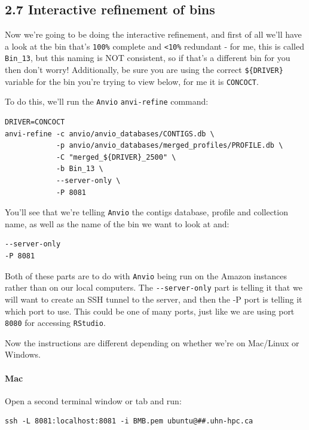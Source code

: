 \documentclass[
]{book}
\begin{document}
\subsection{2.7 Interactive refinement of bins}\label{interactive-refinement-of-bins}

Now we're going to be doing the interactive refinement, and first of all we'll have a look at the bin that's \texttt{100\%} complete and \texttt{\textless{}10\%} redundant - for me, this is called \texttt{Bin\_13}, but this naming is NOT consistent, so if that's a different bin for you then don't worry! Additionally, be sure you are using the correct \texttt{\$\{DRIVER\}} variable for the bin you're trying to view below, for me it is \texttt{CONCOCT}.

To do this, we'll run the \texttt{Anvi\textquotesingle{}o} \texttt{anvi-refine} command:

\begin{verbatim}
DRIVER=CONCOCT
anvi-refine -c anvio/anvio_databases/CONTIGS.db \
            -p anvio/anvio_databases/merged_profiles/PROFILE.db \
            -C "merged_${DRIVER}_2500" \
            -b Bin_13 \
            --server-only \
            -P 8081
\end{verbatim}

You'll see that we're telling \texttt{Anvi\textquotesingle{}o} the contigs database, profile and collection name, as well as the name of the bin we want to look at and:

\begin{verbatim}
--server-only
-P 8081
\end{verbatim}

Both of these parts are to do with \texttt{Anvi\textquotesingle{}o} being run on the Amazon instances rather than on our local computers. The \texttt{-\/-server-only} part is telling it that we will want to create an SSH tunnel to the server, and then the -P port is telling it which port to use. This could be one of many ports, just like we are using port \texttt{8080} for accessing \texttt{RStudio}.

Now the instructions are different depending on whether we're on Mac/Linux or Windows.

\paragraph{Mac}\label{mac}

Open a second terminal window or tab and run:

\begin{verbatim}
ssh -L 8081:localhost:8081 -i BMB.pem ubuntu@##.uhn-hpc.ca
\end{verbatim}
\end{document}
